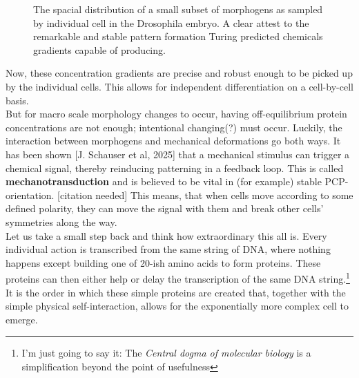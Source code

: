 \begin{figure}[H]
    \centering
    \caption{The spacial distribution of a small subset of morphogens as sampled by individual cell in the Drosophila embryo. A clear attest to the remarkable and stable pattern formation Turing predicted chemicals gradients capable of producing.}
    \label{fig:MorphogenMap}
\end{figure}


Now, these concentration gradients are precise and robust enough to be picked up by the individual cells. This allows for independent differentiation on a cell-by-cell basis.\\


But for macro scale morphology changes to occur, having off-equilibrium protein concentrations are not enough; intentional changing(?) must occur. Luckily, the interaction between morphogens and mechanical deformations go both ways. It has been shown [J. Schauser et al, 2025] that a mechanical stimulus can trigger a chemical signal, thereby reinducing patterning in a feedback loop. This is called \textbf{mechanotransduction} and is believed to be vital in (for example) stable PCP-orientation. [citation needed] This means, that when cells move according to some defined polarity, they can move the signal with them and break other cells' symmetries along the way.  \\


Let us take a small step back and think how extraordinary this all is. Every individual action is transcribed from the same string of DNA, where nothing happens except building one of 20-ish amino acids to form proteins. These proteins can then either help or delay the transcription of the same DNA string.\footnote{I'm just going to say it: The \textit{Central dogma of molecular biology} is a simplification beyond the point of usefulness} It is the order in which these simple proteins are created that, together with the simple physical self-interaction, allows for the exponentially more complex cell to emerge.


